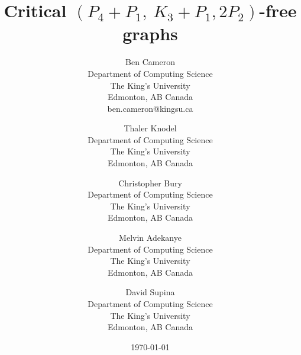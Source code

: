 \documentclass[11pt]{article}
\theoremstyle{definition}
\newcommand{\forbid}{$(P_4+P_1,\ K_3+P_1,2P_2)$}
\begin{document}
\title{Critical \forbid -free graphs}
\author{
Ben Cameron\\ %
\small Department of Computing Science\\
\small The King's University\\
\small Edmonton, AB Canada\\
\small ben.cameron@kingsu.ca\\
\and
Thaler Knodel\\ %
\small Department of Computing Science\\
\small The King's University\\
\small Edmonton, AB Canada\\
\and
Christopher Bury\\ %
\small Department of Computing Science\\
\small The King's University\\
\small Edmonton, AB Canada\\
\and
Melvin Adekanye\\
\small Department of Computing Science\\
\small The King's University\\
\small Edmonton, AB Canada\\
\and
David Supina\\
\small Department of Computing Science\\
\small The King's University\\
\small Edmonton, AB Canada\\
}

\date{\today}

\maketitle
\end{document}
